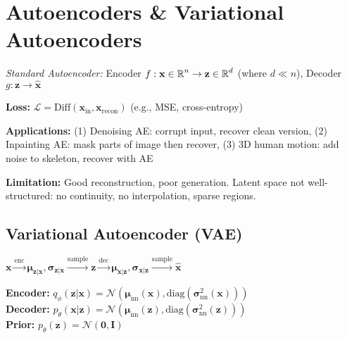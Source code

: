 \section{Autoencoders \& Variational Autoencoders}


\emph{Standard Autoencoder:} Encoder $f: \mathbf{x} \in \operatorname{\mathbb{R}}^n \to \mathbf{z} \in \operatorname{\mathbb{R}}^d$ (where $d \ll n$), Decoder $g: \mathbf{z} \to \hat{\mathbf{x}}$

\textbf{Loss:} $\mathcal{L} = \text{Diff}(\mathbf{x}_{\text{in}}, \mathbf{x}_{\text{recon}})$ (e.g., MSE, cross-entropy)


\textbf{Applications:} (1) Denoising AE: corrupt input, recover clean version, (2) Inpainting AE: mask parts of image then recover, (3) 3D human motion: add noise to skeleton, recover with AE

\textbf{Limitation:} Good reconstruction, poor generation. Latent space not well-structured: no continuity, no interpolation, sparse regions.

\subsection{Variational Autoencoder (VAE)}

$\mathbf{x} \xrightarrow{\text{enc}} \boldsymbol{\mu}_{\mathbf{z}|\mathbf{x}}, \boldsymbol{\sigma}_{\mathbf{z}|\mathbf{x}} \xrightarrow{\text{sample}} \mathbf{z} \xrightarrow{\text{dec}} \boldsymbol{\mu}_{\mathbf{x}|\mathbf{z}}, \boldsymbol{\sigma}_{\mathbf{x}|\mathbf{z}} \xrightarrow{\text{sample}} \hat{\mathbf{x}}$

\textbf{Encoder:} $q_\phi(\mathbf{z} | \mathbf{x}) = \mathcal{N}(\boldsymbol{\mu}_{\text{nn}}(\mathbf{x}), \text{diag}(\boldsymbol{\sigma}_{\text{nn}}^2(\mathbf{x})))$\\
\textbf{Decoder:} $p_\theta(\mathbf{x} | \mathbf{z}) = \mathcal{N}(\boldsymbol{\mu}_{\text{nn}}(\mathbf{z}), \text{diag}(\boldsymbol{\sigma}_{\text{nn}}^2(\mathbf{z})))$\\
\textbf{Prior:} $p_\theta(\mathbf{z}) = \mathcal{N}(\mathbf{0}, \mathbf{I})$

